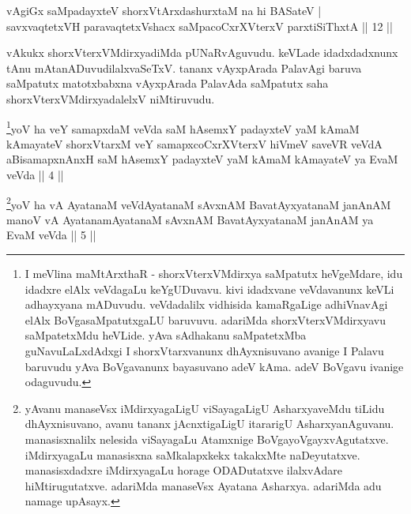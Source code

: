 
\begin{shl}
vAgiGx saMpadayxteV shorxVtArxdashurxtaM na hi BASateV | \\
savxvaqtetxVH paravaqtetxVshacx saMpacoCxrXVterxV parxtiSiThxtA \hfill|| 12 || 
\end{shl}

\begin{artha} 
vAkukx shorxVterxVMdirxyadiMda pUNaRvAguvudu. keVLade idadxdadxnunx 
tAnu mAtanADuvudilalxvaSeTxV. tananx vAyxpArada PalavAgi baruva 
saMpatutx matotxbabxna vAyxpArada PalavAda saMpatutx saha 
shorxVterxVMdirxyadalelxV niMtiruvudu.
\end{artha}


\begin{kandikeshl}
\footnote{I meVlina maMtArxthaR - shorxVterxVMdirxya saMpatutx 
heVgeMdare, idu idadxre elAlx veVdagaLu keYgUDuvavu. kivi idadxvane 
veVdavanunx keVLi adhayxyana mADuvudu. veVdadalilx vidhisida 
kamaRgaLige adhiVnavAgi elAlx BoVgasaMpatutxgaLU baruvuvu. adariMda 
shorxVterxVMdirxyavu saMpatetxMdu heVLide. yAva sAdhakanu saMpatetxMba 
guNavuLaLxdAdxgi I shorxVtarxvanunx dhAyxnisuvano avanige I Palavu 
baruvudu yAva BoVgavanunx bayasuvano adeV kAma. adeV BoVgavu ivanige 
odaguvudu.}yoV ha veY samapxdaM veVda saM hAsemxY padayxteV yaM kAmaM kAmayateV shorxVtarxM veY samapxcoCxrXVterxV hiVmeV saveVR veVdA aBisamapxnAnxH saM hAsemxY padayxteV yaM kAmaM kAmayateV ya EvaM veVda || 4 ||
\end{kandikeshl}

\begin{kandikeshl}
\footnote{yAvanu manaseVsx iMdirxyagaLigU viSayagaLigU AsharxyaveMdu 
tiLidu dhAyxnisuvano, avanu tananx jAcnxtigaLigU itararigU 
AsharxyanAguvanu. manasisxnalilx nelesida viSayagaLu Atamxnige 
BoVgayoVgayxvAgutatxve. iMdirxyagaLu manasisxna saMkalapxkekx 
takakxMte naDeyutatxve. manasisxdadxre iMdirxyagaLu horage ODADutatxve 
ilalxvAdare hiMtirugutatxve. adariMda manaseVsx Ayatana Asharxya. 
adariMda adu namage upAsayx.}yoV ha vA AyatanaM veVdAyatanaM sAvxnAM BavatAyxyatanaM janAnAM manoV vA AyatanamAyatanaM sAvxnAM BavatAyxyatanaM janAnAM ya EvaM veVda || 5 ||
\end{kandikeshl}



